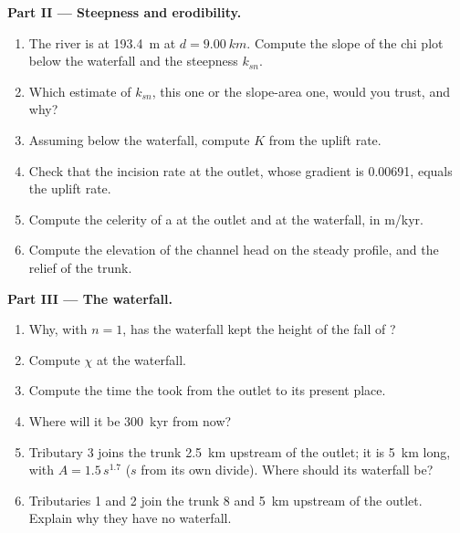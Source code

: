 \begin{problem}
\medskip\noindent\textbf{Part II --- Steepness and erodibility.}
\begin{enumerate}[resume]
\item The river is at \qty{193.4}{m} at $d = \qty{9.00}{km}$. Compute the
  slope of the chi plot below the waterfall and the steepness $k_{sn}$.
\item Which estimate of $k_{sn}$, this one or the slope-area one, would you
  trust, and why?
\item Assuming  below the waterfall, compute $K$ from the
  uplift rate.
\item Check that the incision rate at the outlet, whose gradient is
  0.00691, equals the uplift rate.
\item Compute the celerity of a  at the outlet and at the
  waterfall, in m/kyr.
\item Compute the elevation of the channel head on the steady profile, and
  the relief of the trunk.
\end{enumerate}

\medskip\noindent\textbf{Part III --- The waterfall.}
\begin{enumerate}[resume]
\item Why, with $n = 1$, has the waterfall kept the height of the fall of
  ?
\item Compute $\chi$ at the waterfall.
\item Compute the time the  took from the outlet to its present
  place.
\item Where will it be \qty{300}{kyr} from now?
\item Tributary 3 joins the trunk \qty{2.5}{km} upstream of the outlet; it
  is \qty{5}{km} long, with $A = 1.5\,s^{1.7}$ ($s$ from its own divide).
  Where should its waterfall be?
\item Tributaries 1 and 2 join the trunk 8 and \qty{5}{km} upstream of the
  outlet. Explain why they have no waterfall.
\end{enumerate}


\end{problem}
